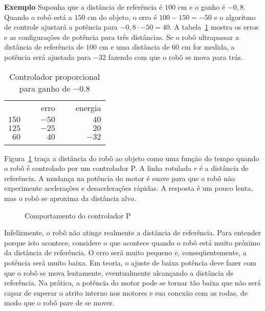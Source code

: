 \medskip

\noindent\textbf{Exemplo} Suponha que a distância de referência é $100$ cm e o ganho é $-0,8$. Quando o robô está a $150$ cm do objeto, o erro é $100-150=-50$ e o algoritmo de controle ajustará a potência para $-0,8\cdot -50=40$. A tabela~\ref{tab.p-controller} mostra os erros e as configurações de potência para três distâncias. Se o robô ultrapassar a distância de referência de $100$ cm e uma distância de $60$ cm for medida, a potência será ajustada para $-32$ fazendo com que o robô se mova para trás.

\begin{table}
\caption{Controlador proporcional para ganho de $-0.8$}
\label{tab.p-controller}
\begin{tabular}{rrr}
\hline\noalign{\smallskip}
\multicolumn{1}{c}{distância} & \multicolumn{1}{c}{\ \ \ erro}& \multicolumn{1}{c}{\ \ \ energia}\\
\noalign{\smallskip}\hline\noalign{\smallskip}
$150$ & $-50$ & $40$\\
$125$ & $-25$ & $20$\\
$60$ & $40$ & $-32$\\
\noalign{\smallskip}\hline\noalign{\smallskip}
\end{tabular}
\end{table}

Figura~\ref{fig.p-control} traça a distância do robô ao objeto como uma função do tempo quando o robô é controlado por um controlador P. A linha rotulada $r$ é a distância de referência. A mudança na potência do motor é suave para que o robô não experimente acelerações e desacelerações rápidas. A resposta é um pouco lenta, mas o robô se aproxima da distância alvo.

\begin{figure}
\begin{center}
\caption{Comportamento do controlador P}\label{fig.p-control}
\end{center}
\end{figure}

Infelizmente, o robô não atinge realmente a distância de referência. Para entender porque isto acontece, considere o que acontece quando o robô está muito próximo da distância de referência. O erro será muito pequeno e, conseqüentemente, a potência será muito baixa. Em teoria, o ajuste de baixa potência deve fazer com que o robô se mova lentamente, eventualmente alcançando a distância de referência. Na prática, a potência do motor pode se tornar tão baixa que não será capaz de superar o atrito interno nos motores e sua conexão com as rodas, de modo que o robô pare de se mover.

